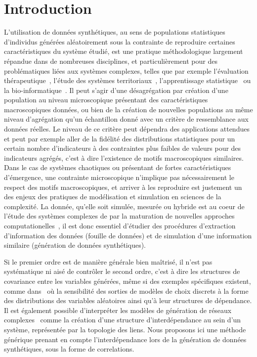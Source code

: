 \section{Introduction}

L'utilisation de données synthétiques, au sens de populations statistiques d'individus générées aléatoirement sous la contrainte de reproduire certaines caractéristiques du système étudié, est une pratique méthodologique largement répandue dans de nombreuses disciplines, et particulièrement pour des problématiques liées aux systèmes complexes, telles que par exemple l'évaluation thérapeutique~\cite{abadie2010synthetic}, l'étude des systèmes territoriaux~\cite{moeckel2003creating,pritchard2009advances}, l'apprentissage statistique~\cite{bolon2013review} ou la bio-informatique~\cite{van2006syntren}. Il peut s'agir d'une désagrégation par création d'une population au niveau microscopique présentant des caractéristiques macroscopiques données, ou bien de la création de nouvelles populations au même niveau d'agrégation qu'un échantillon donné avec un critère de ressemblance aux données réelles. Le niveau de ce critère peut dépendra des applications attendues et peut par exemple aller de la fidélité des distributions statistiques pour un certain nombre d'indicateurs à des contraintes plus faibles de valeurs pour des indicateurs agrégés, c'est à dire l'existence de motifs macroscopiques similaires. Dans le cas de systèmes chaotiques ou présentant de fortes caractéristiques d'émergence, une contrainte microscopique n'implique pas nécessairement le respect des motifs macroscopiques, et arriver à les reproduire est justement un des enjeux des pratiques de modélisation et simulation en sciences de la complexité. La donnée, qu'elle soit simulée, mesurée ou hybride est au coeur de l'étude des systèmes complexes de par la maturation de nouvelles approches computationelles~\cite{arthur2015complexity}, il est donc essentiel d'étudier des procédures d'extraction d'information des données (fouille de données) et de simulation d'une information similaire (génération de données synthétiques).

Si le premier ordre est de manière générale bien maîtrisé, il n'est pas systématique ni aisé de contrôler le second ordre, c'est à dire les structures de covariance entre les variables générées, même si des exemples spécifiques existent, comme dans~\cite{ye2011investigation} où la sensibilité des sorties de modèles de choix discrets à la forme des distributions des variables aléatoires ainsi qu'à leur structures de dépendance. Il est également possible d'interpréter les modèles de génération de réseaux complexes~\cite{newman2003structure} comme la création d'une structure d'interdépendance au sein d'un système, représentée par la topologie des liens. Nous proposons ici une méthode générique prenant en compte l'interdépendance lors de la génération de données synthétiques, sous la forme de correlations.

